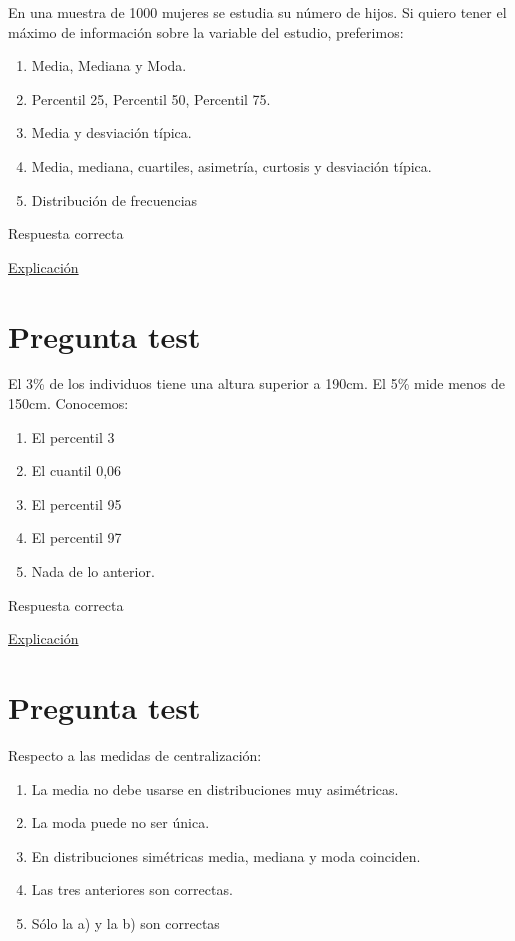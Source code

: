 \documentclass[
]{book}
\providecommand{\tightlist}{%
  \setlength{\itemsep}{0pt}\setlength{\parskip}{0pt}}
\begin{document}
En una muestra de 1000 mujeres se estudia su número de hijos. Si quiero tener el máximo de información sobre la variable del estudio, preferimos:

\begin{enumerate}
\def\labelenumi{\alph{enumi})}
\tightlist
\item
  Media, Mediana y Moda.
\item
  Percentil 25, Percentil 50, Percentil 75.
\item
  Media y desviación típica.
\item
  Media, mediana, cuartiles, asimetría, curtosis y desviación típica.
\item
  Distribución de frecuencias
\end{enumerate}

Respuesta correcta

\href{https://1fjmanzano.github.io/bioestadistica/tablas-de-frecuencias.html}{Explicación}

\hypertarget{pregunta-test-80}{%
\section{Pregunta test}\label{pregunta-test-80}}

El 3\% de los individuos tiene una altura superior a 190cm. El 5\% mide menos de 150cm. Conocemos:

\begin{enumerate}
\def\labelenumi{\alph{enumi})}
\tightlist
\item
  El percentil 3
\item
  El cuantil 0,06
\item
  El percentil 95
\item
  El percentil 97
\item
  Nada de lo anterior.
\end{enumerate}

Respuesta correcta

\href{https://1fjmanzano.github.io/bioestadistica/medidas-de-posicio\%CC\%81n-dispersio\%CC\%81n-y-forma.html\#medidas-de-posicio\%CC\%81n-no-centrales}{Explicación}

\hypertarget{pregunta-test-81}{%
\section{Pregunta test}\label{pregunta-test-81}}

Respecto a las medidas de centralización:

\begin{enumerate}
\def\labelenumi{\alph{enumi})}
\tightlist
\item
  La media no debe usarse en distribuciones muy asimétricas.
\item
  La moda puede no ser única.
\item
  En distribuciones simétricas media, mediana y moda coinciden.
\item
  Las tres anteriores son correctas.
\item
  Sólo la a) y la b) son correctas
\end{enumerate}
\end{document}

